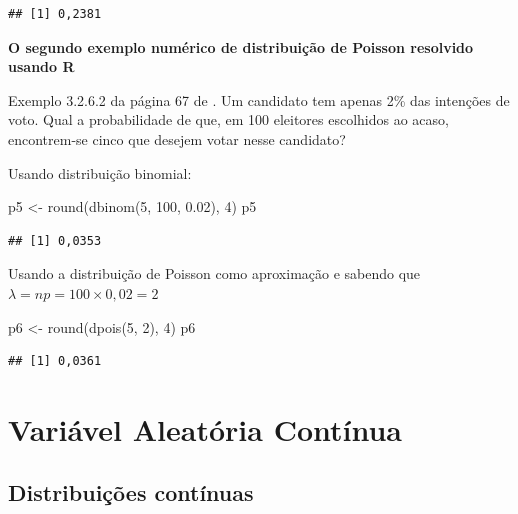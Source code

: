 \documentclass[
]{book}
\newenvironment{Shaded}{\begin{snugshade}}{\end{snugshade}}
\newcommand{\DecValTok}[1]{\textcolor[rgb]{0.00,0.00,0.81}{#1}}
\newcommand{\FloatTok}[1]{\textcolor[rgb]{0.00,0.00,0.81}{#1}}
\newcommand{\FunctionTok}[1]{\textcolor[rgb]{0.00,0.00,0.00}{#1}}
\newcommand{\NormalTok}[1]{#1}
\newcommand{\OtherTok}[1]{\textcolor[rgb]{0.56,0.35,0.01}{#1}}
\begin{document}
\begin{verbatim}
## [1] 0,2381
\end{verbatim}

\textbf{O segundo exemplo numérico de distribuição de Poisson resolvido usando R}

Exemplo 3.2.6.2 da página 67 de \citet{Sartoris2013}. Um candidato tem apenas 2\% das intenções de voto. Qual a probabilidade de que, em 100 eleitores escolhidos ao acaso, encontrem-se cinco que desejem votar nesse candidato?

Usando distribuição binomial:

\begin{Shaded}
\begin{Highlighting}[]
\NormalTok{p5 }\OtherTok{\textless{}{-}} \FunctionTok{round}\NormalTok{(}\FunctionTok{dbinom}\NormalTok{(}\DecValTok{5}\NormalTok{, }\DecValTok{100}\NormalTok{, }\FloatTok{0.02}\NormalTok{), }\DecValTok{4}\NormalTok{)}
\NormalTok{p5}
\end{Highlighting}
\end{Shaded}

\begin{verbatim}
## [1] 0,0353
\end{verbatim}

Usando a distribuição de Poisson como aproximação e sabendo que \(\lambda = np = 100\times 0,02 = 2\)

\begin{Shaded}
\begin{Highlighting}[]
\NormalTok{p6 }\OtherTok{\textless{}{-}} \FunctionTok{round}\NormalTok{(}\FunctionTok{dpois}\NormalTok{(}\DecValTok{5}\NormalTok{, }\DecValTok{2}\NormalTok{), }\DecValTok{4}\NormalTok{)}
\NormalTok{p6}
\end{Highlighting}
\end{Shaded}

\begin{verbatim}
## [1] 0,0361
\end{verbatim}

\hypertarget{variuxe1vel-aleatuxf3ria-contuxednua}{%
\chapter{Variável Aleatória Contínua}\label{variuxe1vel-aleatuxf3ria-contuxednua}}

\hypertarget{distribuiuxe7uxf5es-contuxednuas}{%
\section{Distribuições contínuas}\label{distribuiuxe7uxf5es-contuxednuas}}
\end{document}
